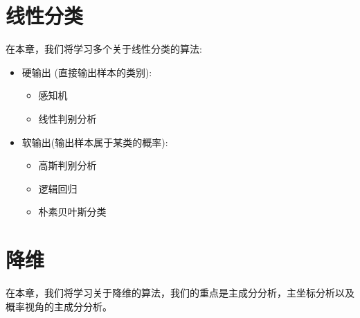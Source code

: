 \documentclass{report}
\begin{document}
\chapter{线性分类}
在本章，我们将学习多个关于线性分类的算法:
\begin{itemize}
	\item 硬输出 (直接输出样本的类别):
	\begin{itemize}
		\item 感知机
		\item 线性判别分析
	\end{itemize}
	\item 软输出(输出样本属于某类的概率):
	\begin{itemize}
	\item 高斯判别分析
	\item 逻辑回归
	\item 朴素贝叶斯分类
	\end{itemize}
\end{itemize}






\chapter{降维}
在本章，我们将学习关于降维的算法，我们的重点是主成分分析，主坐标分析以及概率视角的主成分分析。



\end{document}
